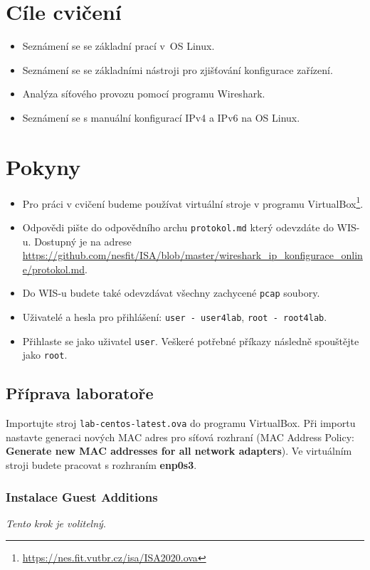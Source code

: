 \section*{Cíle cvičení}
\begin{itemize}
	\item Seznámení se se základní prací v~OS Linux.
	\item Seznámení se se základními nástroji pro zjišťování konfigurace zařízení.
	\item Analýza síťového provozu pomocí programu Wireshark.
	\item Seznámení se s manuální konfigurací IPv4 a IPv6 na OS Linux.
\end{itemize}

\section*{Pokyny}
\begin{itemize}
\item Pro práci v cvičení budeme používat virtuální stroje v programu
  VirtualBox\footnote{\url{https://nes.fit.vutbr.cz/isa/ISA2020.ova}}.
\item Odpovědi pište do odpovědního archu \texttt{protokol.md} který odevzdáte do WIS-u. Dostupný je na adrese \url{https://github.com/nesfit/ISA/blob/master/wireshark_ip_konfigurace_online/protokol.md}.
\item Do WIS-u budete také odevzdávat všechny zachycené \texttt{pcap} soubory.
\item Uživatelé a hesla pro přihlášení: \texttt{user - user4lab}, \texttt{root - root4lab}.
\item Přihlaste se jako uživatel \texttt{user}. Veškeré potřebné příkazy následně spouštějte jako \texttt{root}.
\end{itemize}

\subsection*{Příprava laboratoře}
Importujte stroj \texttt{lab-centos-latest.ova} do programu VirtualBox.
Při importu nastavte generaci nových MAC adres pro síťová rozhraní (MAC Address Policy: \textbf{Generate new MAC addresses for all network adapters}).
Ve virtuálním stroji budete pracovat s rozhraním {\bf enp0s3}.

\subsubsection*{Instalace Guest Additions}
\textit{Tento krok je volitelný}.

